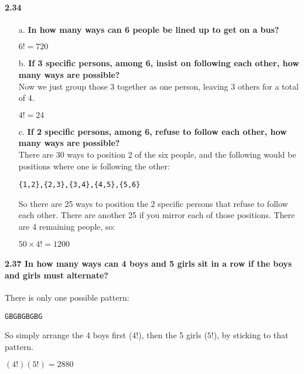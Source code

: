 \documentclass{article}
\begin{document}
\paragraph{2.34}
\begin{enumerate}
\item[a.] \textbf{In how many ways can 6 people be lined up to get on a bus?}\\
\begin{center}
$\boxed{6! = 720}$
\end{center}
\item[b.] \textbf{If 3 specific persons, among 6, insist on following each other, how many 
ways are possible?}\\
Now we just group those 3 together as one person, leaving 3 others for a total of 4.
\begin{center}
$\boxed{4! = 24}$
\end{center}
\item[c.] \textbf{If 2 specific persons, among 6, refuse to follow each other, how many 
ways are possible?}\\
There are 30 ways to position 2 of the six people, and the following would be positions
where one is following the other:
\begin{verbatim}
{1,2},{2,3},{3,4},{4,5},{5,6}
\end{verbatim}
So there are 25 ways to position the 2 specific persons that refuse to follow each other.
There are another 25 if you mirror each of those positions.
There are 4 remaining people, so:
\begin{center}
$\boxed{50 \times 4! = 1200}$
\end{center}
\end{enumerate}

\paragraph{2.37 In how many ways can 4 boys and 5 girls sit in a row if the boys and
girls must alternate?\\}
There is only one possible pattern:
\begin{verbatim}
GBGBGBGBG
\end{verbatim}
So simply arrange the 4 boys first ($4!$), then the 5 girls ($5!$), by sticking to that pattern.
\begin{center}
$\boxed{(4!)(5!) = 2880}$
\end{center}
\end{document}
